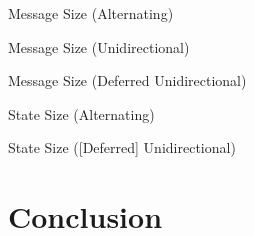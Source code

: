 \documentclass{beamer}
\begin{document}
\begin{frame}{Message Size (Alternating)}
   \begin{figure}[H]
    \centering
     
  \end{figure}
\end{frame}

\begin{frame}{Message Size (Unidirectional)}
   \begin{figure}[H]
    \centering
     
  \end{figure}
\end{frame}

\begin{frame}{Message Size (Deferred Unidirectional)}
   \begin{figure}[H]
    \centering
     
  \end{figure}
\end{frame}

\begin{frame}{State Size (Alternating)}
   \begin{figure}[H]
    \centering
     
  \end{figure}
\end{frame}

\begin{frame}{State Size ([Deferred] Unidirectional)}
   \begin{figure}[H]
    \centering
     
  \end{figure}
\end{frame}

\section{Conclusion}
\label{sec:conclusion}
\end{document}
